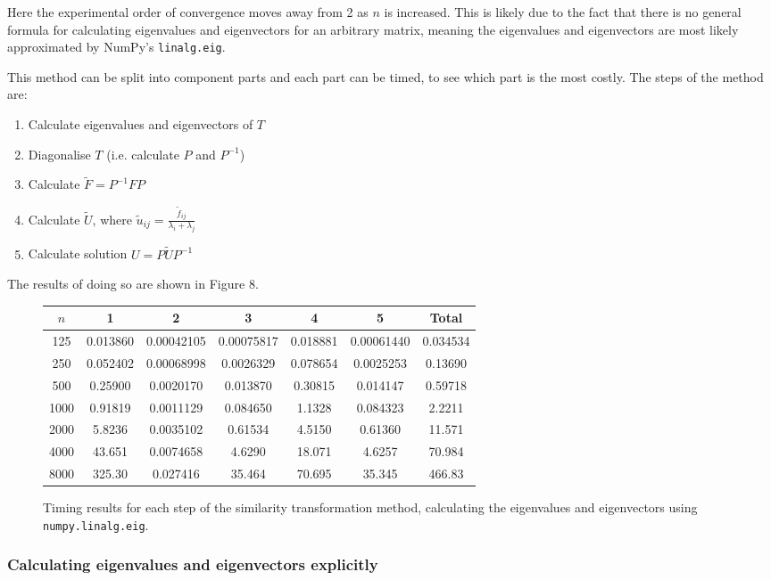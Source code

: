 \documentclass{article}
\numberwithin{equation}{section}
\begin{document}
Here the experimental order of convergence moves away from 2 as $n$ is increased. This is likely due to the fact that there is no general formula for calculating eigenvalues and eigenvectors for an arbitrary matrix, meaning the eigenvalues and eigenvectors are most likely approximated by NumPy's \texttt{linalg.eig}.

This method can be split into component parts and each part can be timed, to see which part is the most costly. The steps of the method are:
\begin{enumerate}
\item Calculate eigenvalues and eigenvectors of $T$
\item Diagonalise $T$ (i.e. calculate $P$ and $P^{-1}$)
\item Calculate $\tilde{F}=P^{-1}FP$
\item Calculate $\tilde{U}$, where $\tilde{u}_{ij} = \frac{\tilde{f}_{ij}}{\lambda_i + \lambda_j}$
\item Calculate solution $U=P \tilde{U}P^{-1}$
\end{enumerate}

The results of doing so are shown in Figure 8.

\begin{figure}[H]
\centering
\begin{tabular}{|c|c|c|c|c|c|c|}
\hline
$n$ & 1 & 2 & 3 & 4 & 5 & Total \\
\hline
125 & 0.013860 & 0.00042105 & 0.00075817 & 0.018881 & 0.00061440 & 0.034534 \\
250 & 0.052402 & 0.00068998 & 0.0026329 & 0.078654 & 0.0025253 & 0.13690 \\
500 & 0.25900 & 0.0020170 & 0.013870 & 0.30815 & 0.014147 & 0.59718 \\
1000 & 0.91819 & 0.0011129 & 0.084650 & 1.1328 & 0.084323 & 2.2211 \\
2000 & 5.8236 & 0.0035102 & 0.61534 & 4.5150 & 0.61360 & 11.571 \\
4000 & 43.651 & 0.0074658 & 4.6290 & 18.071 & 4.6257 & 70.984 \\
8000 & 325.30 & 0.027416 & 35.464 & 70.695 & 35.345 & 466.83 \\
\hline
\end{tabular}
\captionsetup{justification=centering}
\caption{Timing results for each step of the similarity transformation method, calculating the eigenvalues and eigenvectors using \texttt{numpy.linalg.eig}.}
\end{figure}

\subsubsection*{Calculating eigenvalues and eigenvectors explicitly}
\end{document}
